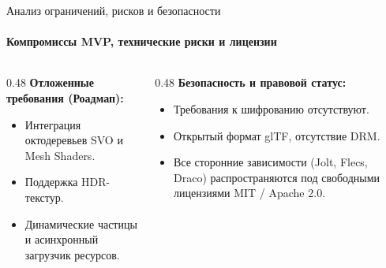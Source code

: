 \begin{frame}{Анализ ограничений, рисков и безопасности}
  \framesubtitle{Компромиссы MVP, технические риски и лицензии}
  \begin{columns}[T]
    \begin{column}{0.48\textwidth}
      \textbf{Отложенные требования (Роадмап):}
      \begin{itemize}
        \item {} Интеграция октодеревьев SVO и Mesh Shaders.
        \item {} Поддержка HDR-текстур.
        \item {} Динамические частицы и асинхронный загрузчик ресурсов.
      \end{itemize}
    \end{column}
    \begin{column}{0.48\textwidth}
      \textbf{Безопасность и правовой статус:}
      \begin{itemize}
        \item {} Требования к шифрованию отсутствуют.
        \item {} Открытый формат glTF, отсутствие DRM.
        \item {} Все сторонние зависимости (Jolt, Flecs, Draco)
              распространяются под свободными лицензиями MIT / Apache 2.0.
      \end{itemize}
    \end{column}
  \end{columns}
\end{frame}

